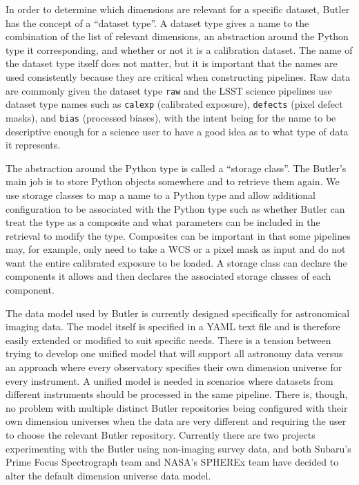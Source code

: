 \documentclass[]{spie}
\begin{document}
In order to determine which dimensions are relevant for a specific dataset, Butler has the concept of a ``dataset type''.
A dataset type gives a name to the combination of the list of relevant dimensions, an abstraction around the Python type it corresponding, and whether or not it is a calibration dataset.
The name of the dataset type itself does not matter, but it is important that the names are used consistently because they are critical when constructing pipelines.
Raw data are commonly given the dataset type \texttt{raw} and the LSST science pipelines use dataset type names such as \texttt{calexp} (calibrated exposure), \texttt{defects} (pixel defect masks), and \texttt{bias} (processed biases), with the intent being for the name to be descriptive enough for a science user to have a good idea as to what type of data it represents.

The abstraction around the Python type is called a ``storage class''.
The Butler's main job is to store Python objects somewhere and to retrieve them again.
We use storage classes to map a name to a Python type and allow additional configuration to be associated with the Python type such as whether Butler can treat the type as a composite and what parameters can be included in the retrieval to modify the type.
Composites can be important in that some pipelines may, for example, only need to take a WCS or a pixel mask as input and do not want the entire calibrated exposure to be loaded.
A storage class can declare the components it allows and then declares the associated storage classes of each component.

The data model used by Butler is currently designed specifically for astronomical imaging data.
The model itself is specified in a YAML text file and is therefore easily extended or modified to suit specific needs.
There is a tension between trying to develop one unified model that will support all astronomy data versus an approach where every observatory specifies their own dimension universe for every instrument.
A unified model is needed in scenarios where datasets from different instruments should be processed in the same pipeline.
There is, though, no problem with multiple distinct Butler repositories being configured with their own dimension universes when the data are very different and requiring the user to choose the relevant Butler repository.
Currently there are two projects experimenting with the Butler using non-imaging survey data, and both Subaru's Prime Focus Spectrograph\cite{2020SPIE11447E..7VW} team and NASA's SPHEREx team\cite{2020SPIE11443E..0IC} have decided to alter the default dimension universe data model.
\end{document}
